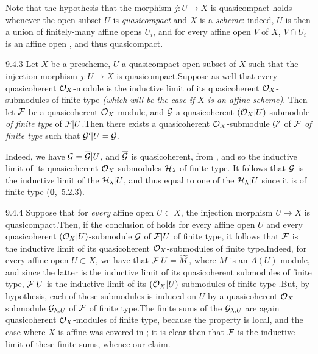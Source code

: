 Note that the hypothesis that the morphism $j\colon U\to X$ is quasicompact
holds whenever the open subset $U$ is \emph{quasicompact} and $X$ is a
\emph{scheme}: indeed, $U$ is then a union of finitely-many affine opens $U_i$,
and for every affine open $V$ of $X$, $V\cap U_i$ is an affine open , and
thus quasicompact.
 
\begin{env}[Corollary]{9.4.3}
Let $X$ be a prescheme, $U$ a quasicompact open
subset of $X$ such that the injection morphism $j\colon U\to X$ is
quasicompact.Suppose as well that every quasicoherent $\mathcal{O}_X$-module is the
inductive limit of its quasicoherent $\mathcal{O}_X$-submodules of finite type
\emph{(which will be the case if $X$ is an \emph{affine scheme})}. Then let
$\mathcal{F}$ be a quasicoherent $\mathcal{O}_X$-module, and $\mathcal{G}$ a quasicoherent
$(\mathcal{O}_X|U)$-submodule \emph{of finite type} of $\mathcal{F}|U$.Then there exists
a quasicoherent $\mathcal{O}_X$-submodule $\mathcal{G}'$ of $\mathcal{F}$ \emph{of finite
type} such that $\mathcal{G}'|U=\mathcal{G}$.
\end{env}
 
Indeed, we have $\mathcal{G}=\overline{\mathcal{G}}|U$, and $\overline{\mathcal{G}}$
is quasicoherent, from , and so the inductive limit of its
quasicoherent $\mathcal{O}_X$-submodules $\mathcal{H}_\lambda$ of finite type. It
follows that $\mathcal{G}$ is the inductive limit of the $\mathcal{H}_\lambda|U$,
and thus equal to one of the $\mathcal{H}_\lambda|U$ since it is of finite type
(\textbf{0},~5.2.3).
 
\begin{env}[Remark]{9.4.4}
Suppose that for \emph{every} affine open $U\subset
X$, the injection morphism $U\to X$ is quasicompact.Then, if the conclusion
of  holds for every affine open $U$ and every quasicoherent
$(\mathcal{O}_X|U)$-submodule $\mathcal{G}$ of $\mathcal{F}|U$ of finite type, it
follows that $\mathcal{F}$ is the inductive limit of its
quasicoherent $\mathcal{O}_X$-submodules of finite type.Indeed, for every affine open
$U\subset X$, we have that $\mathcal{F}|U=\widetilde{M}$, where $M$ is an
$A(U)$-module, and since the latter is the inductive limit of its quasicoherent
submodules of finite type, $\mathcal{F}|U$ is the inductive limit of its
$(\mathcal{O}_X|U)$-submodules of finite type .But, by hypothesis, each of
these submodules is induced on $U$ by a quasicoherent $\mathcal{O}_X$-submodule
$\mathcal{G}_{\lambda,U}$ of $\mathcal{F}$ of finite type.The finite sums of the
$\mathcal{G}_{\lambda,U}$ are again quasicoherent $\mathcal{O}_X$-modules of finite type,
because the property is local, and the case where $X$ is affine was covered in
; it is clear then that $\mathcal{F}$ is the inductive limit of these
finite sums, whence our claim.
\end{env}
 
